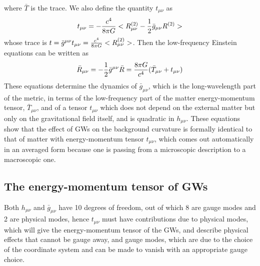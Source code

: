 \documentclass[binding=0.6cm, LaM]{sapthesis}
\begin{document}
where ${\bar T}$ is the trace. 
We also define the quantity $t_{\mu\nu}$ as
\begin{equation}
t_{\mu\nu} = -{{c^4}\over{8\pi G}}<R_{\mu\nu}^{(2)} - {1 \over 2}{\bar g_{\mu \nu}}R^{(2)}>
\end{equation}
whose trace is $t= {\bar g^{\mu\nu}}t_{\mu\nu} = {{c^4}\over{8\pi G}}<R_{\mu\nu}^{(2)}>$.
Then the low-frequency Einstein equations can be written as
\begin{equation}
 {\bar R_{\mu\nu}} = -{1 \over 2}{\bar g^{\mu\nu}} {\bar R} =  {{8\pi G}\over c^4}({\bar T_{\mu\nu}}+t_{\mu\nu})
\end{equation}
These equations determine the dynamics of $\bar g_{\mu\nu}$, which is the long-wavelength part of the metric, in terms of the low-frequency part of the matter energy-momentum tensor, $\bar T_{\mu\nu}$, and of a tensor $t_{\mu\nu}$ which does not depend on the external matter but only on the gravitational field itself, and is quadratic in $h_{\mu\nu}$.
These equations show that the effect of GWs on the background curvature is formally identical to that of matter with energy-momentum tensor $t_{\mu\nu}$, which comes out automatically in an averaged form because one is passing from a microscopic description to a macroscopic one.

\subsection{The energy-momentum tensor of GWs}
Both $h_{\mu\nu}$ and $\bar g_{\mu\nu}$ have 10 degrees of freedom, out of which 8 are gauge modes and 2 are physical modes, hence $t_{\mu\nu}$ must have contributions due to physical modes, which will give the energy-momentum tensor of the GWs, and describe physical effects that cannot be gauge away, and gauge modes, which are due to the choice of the coordinate system and can be made to vanish with an appropriate gauge choice.
\end{document}
